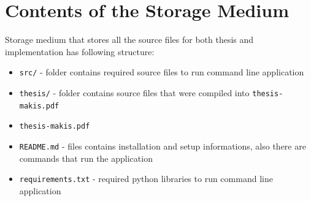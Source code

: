 \chapter{Contents of the Storage Medium}
\label{app:content}
Storage medium that stores all the source files for both thesis and implementation has following structure:
\begin{itemize}
    \item{\texttt{src/} - folder contains required source files to run command line application}
    \item{\texttt{thesis/} - folder contains source files that were compiled into \texttt{thesis-makis.pdf}}
    \item{\texttt{thesis-makis.pdf}}
    \item{\texttt{README.md} - files contains installation and setup informations, also there are commands that run the application}
    \item{\texttt{requirements.txt} - required python libraries to run command line application}
\end{itemize}